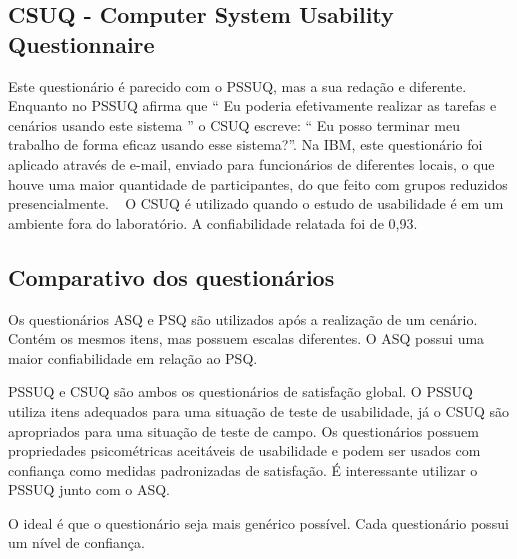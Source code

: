 \subsection{CSUQ - Computer System Usability Questionnaire}

	Este questionário é parecido com o PSSUQ, mas a sua redação e diferente. Enquanto no PSSUQ afirma que “ Eu poderia efetivamente realizar as tarefas e cenários usando este sistema ” o CSUQ escreve: “ Eu posso terminar meu trabalho de forma eficaz usando esse sistema?”. Na IBM, este questionário foi aplicado através de e-mail, enviado para funcionários de diferentes locais, o que houve uma maior quantidade de participantes, do que feito com grupos reduzidos presencialmente. ~\cite{lewis1995ibm} 
	O CSUQ é utilizado quando o estudo de usabilidade é em um ambiente fora do laboratório. A confiabilidade relatada foi de 0,93.



\subsection{Comparativo dos questionários}

	Os questionários ASQ e PSQ são utilizados após a realização de um cenário. Contém os mesmos itens, mas possuem escalas diferentes. O ASQ possui uma maior confiabilidade em relação ao PSQ. 

	PSSUQ e CSUQ são ambos os questionários de satisfação global. O PSSUQ utiliza itens adequados para uma situação de teste de usabilidade, já o CSUQ são apropriados para uma situação de teste de campo. Os questionários possuem propriedades psicométricas aceitáveis de usabilidade e podem ser usados com confiança como medidas padronizadas de satisfação. É interessante utilizar o PSSUQ junto com o ASQ.

	O ideal é que o questionário seja mais genérico possível. Cada questionário possui um nível de confiança.

